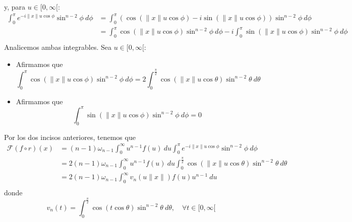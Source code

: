 \documentclass[12pt]{report}
\theoremstyle{largebreak}
\newcommand\norm[1]{\ensuremath{\|#1\|}}
\newcommand{\fou}[1]{\ensuremath{\mathcal{F}#1}}
\begin{document}
\begin{sol}
        y, para $u\in[0,\infty[$:
        \begin{equation*}
            \begin{split}
                \int_{0}^\pi e^{ -i\norm{x}u\cos\phi}\sin^{ n-2}\phi\:d\phi&=\int_{0}^\pi \left(\cos(\norm{x}u\cos\phi)-i\sin(\norm{x}u\cos\phi)\right) \sin^{ n-2}\phi\:d\phi\\
                &=\int_{0}^\pi\cos(\norm{x}u\cos\phi)\sin^{ n-2}\phi\:d\phi-i\int_{0}^\pi\sin(\norm{x}u\cos\phi)\sin^{ n-2}\phi\:d\phi\\
            \end{split}
        \end{equation*}
        Analicemos ambas integrables. Sea $u\in[0,\infty[$:
        \begin{itemize}
            \item Afirmamos que
            \begin{equation*}
                \int_{0}^\pi\cos(\norm{x}u\cos\phi)\sin^{ n-2}\phi\:d\phi=2\int_{0}^{\frac{\pi}{2}}\cos(\norm{x}u\cos\theta)\sin^{ n-2}\theta\:d\theta
            \end{equation*}
            \item Afirmamos que
            \begin{equation*}
                \int_{0}^\pi\sin(\norm{x}u\cos\phi)\sin^{ n-2}\phi\:d\phi=0
            \end{equation*}
        \end{itemize}
        Por los dos incisos anteriores, tenemos que
        \begin{equation*}
            \begin{split}
                \fou{(f\circ r)}(x)&=(n-1)\omega_{n-1}\int_{0}^\infty u^{ n-1}f(u)\:du \int_{0}^\pi e^{ -i\norm{x}u\cos\phi}\sin^{ n-2}\phi\:d\phi\\
                &=2(n-1)\omega_{n-1}\int_{0}^\infty u^{ n-1}f(u)\:du \int_{0}^{\frac{\pi}{2}}\cos(\norm{x}u\cos\theta)\sin^{ n-2}\theta\:d\theta\\
                &=2(n-1)\omega_{n-1}\int_{0}^\infty v_n(u\norm{x})f(u)u^{ n-1}\:du\\
            \end{split}
        \end{equation*}
        donde
        \begin{equation*}
            v_n(t)=\int_{0}^{\frac{\pi}{2}}\cos(t\cos\theta)\sin^{ n-2}\theta\:d\theta,\quad\forall t\in[0,\infty[
        \end{equation*}
    \end{sol}
\end{document}

